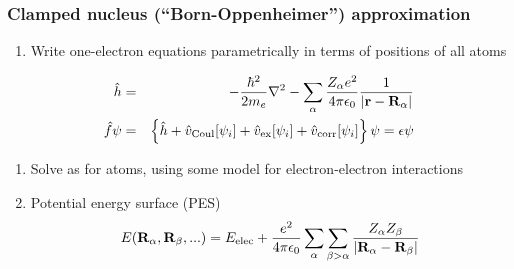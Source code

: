 \documentclass[11pt]{article}
\begin{document}
\subsubsection{Clamped nucleus (``Born-Oppenheimer'') approximation}
\label{sec:org2b4a353}
\begin{enumerate}
\item Write one-electron equations parametrically in terms of positions of  all atoms
\end{enumerate}
\begin{eqnarray}
\hat h & = & -\frac{\hbar^2}{2m_e}\nabla^2-\sum_\alpha \frac{Z_\alpha
          e^2}{4\pi\epsilon_0}\frac{1}{|{\bf r}-{\bf R}_\alpha|} \\
\hat f\psi & = & \left\{\hat h + \hat v_\mathrm{Coul}[\psi_i] + \hat
            v_\mathrm{ex}[\psi_i]+\hat v_\mathrm{corr}[\psi_i] \right\}\psi=\epsilon\psi
\end{eqnarray}
\begin{enumerate}
\item Solve as for atoms, using some model for electron-electron interactions
\item Potential energy surface (PES)
\[ E({\bf R}_\alpha, {\bf
            R}_\beta,...)=E_\mathrm{elec}+\frac{e^2}{4\pi\epsilon_0}\sum_\alpha\sum_{\beta>\alpha}\frac{Z_\alpha
            Z_\beta}{|{\bf R}_\alpha-{\bf R}_\beta|} \]
\end{enumerate}
\end{document}
